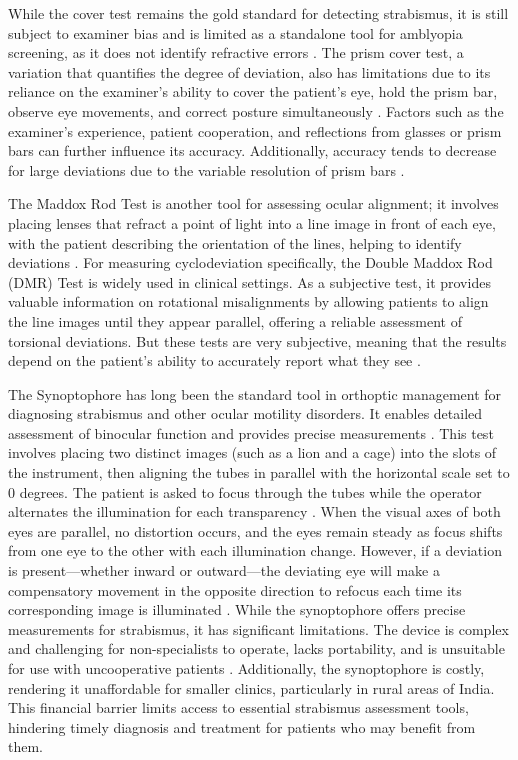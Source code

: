 \documentclass{article}
\begin{document}
While the cover test remains the gold standard for detecting strabismus, it is still subject to examiner bias and is limited as a standalone tool for amblyopia screening, as it does not identify refractive errors \cite{8}. The prism cover test, a variation that quantifies the degree of deviation, also has limitations due to its reliance on the examiner’s ability to cover the patient’s eye, hold the prism bar, observe eye movements, and correct posture simultaneously \cite{15}. Factors such as the examiner’s experience, patient cooperation, and reflections from glasses or prism bars can further influence its accuracy. Additionally, accuracy tends to decrease for large deviations due to the variable resolution of prism bars \cite{15,16}.

The Maddox Rod Test is another tool for assessing ocular alignment; it involves placing lenses that refract a point of light into a line image in front of each eye, with the patient describing the orientation of the lines, helping to identify deviations \cite{9}. For measuring cyclodeviation specifically, the Double Maddox Rod (DMR) Test is widely used in clinical settings. As a subjective test, it provides valuable information on rotational misalignments by allowing patients to align the line images until they appear parallel, offering a reliable assessment of torsional deviations. But these tests are very subjective, meaning that the results depend on the patient's ability to accurately report what they see \cite{9}.


The Synoptophore has long been the standard tool in orthoptic management for diagnosing strabismus and other ocular motility disorders. It enables detailed assessment of binocular function and provides precise measurements \cite{Technique for Measuring Strabismus with Synoptophore}. This test involves placing two distinct images (such as a lion and a cage) into the slots of the instrument, then aligning the tubes in parallel with the horizontal scale set to 0 degrees. The patient is asked to focus through the tubes while the operator alternates the illumination for each transparency \cite{18}. When the visual axes of both eyes are parallel, no distortion occurs, and the eyes remain steady as focus shifts from one eye to the other with each illumination change. However, if a deviation is present—whether inward or outward—the deviating eye will make a compensatory movement in the opposite direction to refocus each time its corresponding image is illuminated \cite{18,19,20}. While the synoptophore offers precise measurements for strabismus, it has significant limitations. The device is complex and challenging for non-specialists to operate, lacks portability, and is unsuitable for use with uncooperative patients \cite{21}. Additionally, the synoptophore is costly, rendering it unaffordable for smaller clinics, particularly in rural areas of India. This financial barrier limits access to essential strabismus assessment tools, hindering timely diagnosis and treatment for patients who may benefit from them.
\end{document}
